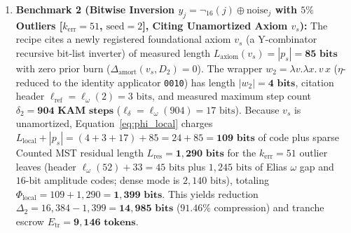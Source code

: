 \documentclass[runningheads,a4paper]{llncs}
\renewcommand{\_}{\textunderscore\allowbreak}
\begin{document}
\begin{enumerate}
  \item \textbf{Benchmark 2 (Bitwise Inversion $y_j = \neg_{16}(j) \oplus \text{noise}_j$ with $5\%$ Outliers [$k_{\text{err}} = 51$, $\text{seed} = 2$], Citing Unamortized Axiom $v_s$):} The recipe cites a newly registered foundational axiom $v_s$ (a Y-combinator recursive bit-list inverter) of measured length $L_{\text{axiom}}(v_s) = |p_s| = \mathbf{85\text{ bits}}$ with zero prior burn ($\Delta_{\text{amort}}(v_s,\allowbreak D_2) = 0$). The wrapper $w_2 = \lambda v.\lambda x.\,\allowbreak v\,\allowbreak x$ ($\eta$-reduced to the identity applicator \texttt{0010}) has length $|w_2| = \mathbf{4\text{ bits}}$, citation header $\ell_{\text{ref}} = \ell_\omega(2) = 3\text{ bits}$, and measured maximum step count $\delta_2 = \mathbf{904\text{ KAM steps}}$ ($\ell_\delta = \ell_\omega(904) = 17\text{ bits}$). Because $v_s$ is unamortized, Equation~\eqref{eq:phi_local} charges $L_{\text{local}} + |p_s| = (4 + 3 + 17) + 85 = 24 + 85 = \mathbf{109\text{ bits}}$ of code plus sparse Counted MST residual length $L_{\text{res}} = \mathbf{1,290\text{ bits}}$ for the $k_{\text{err}} = 51$ outlier leaves (header $\ell_\omega(52) + 33 = 45\text{ bits}$ plus $1,245\text{ bits}$ of Elias $\omega$ gap and $16\text{-bit}$ amplitude codes; dense mode is $2,140\text{ bits}$), totaling $\Phi_{\text{local}} = 109 + 1,290 = \mathbf{1,399\text{ bits}}$. This yields reduction $\Delta_2 = 16,384 - 1,399 = \mathbf{14,985\text{ bits}}$ ($\mathbf{91.46\%}$ compression) and tranche escrow $E_{\text{tr}} = \mathbf{9,146\text{ tokens}}$.

\end{enumerate}
\end{document}
